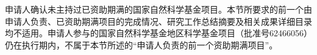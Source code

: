 \justifying
\NSFCBodyText

申请人确认未主持过已资助期满的国家自然科学基金项目。本节所要求的前一个由申请人负责、已资助期满项目的完成情况、研究工作总结摘要及相关成果详细目录均不适用。申请人参与的国家自然科学基金地区科学基金项目（批准号62466056）仍在执行期内，不属于本节所述的“申请人负责的前一个资助期满项目”。
